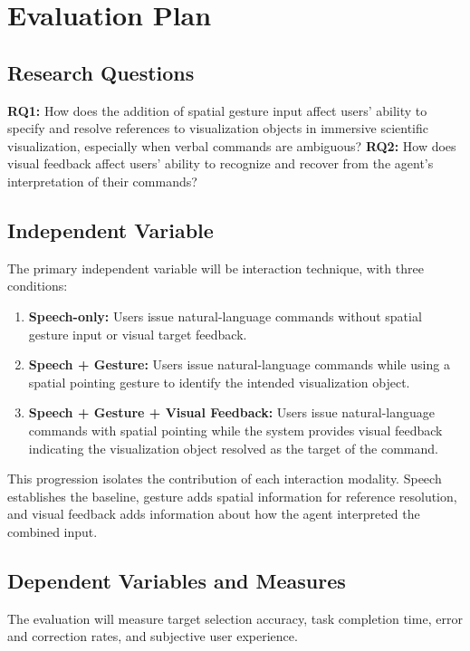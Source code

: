\documentclass[sigconf,nonacm]{acmart}
\begin{document}
\section{Evaluation Plan}
\subsection{Research Questions}

\textbf{RQ1:} How does the addition of spatial gesture input affect users' ability to specify and resolve references to visualization objects in immersive scientific visualization, especially when verbal commands are ambiguous?
\textbf{RQ2:} How does visual feedback affect users' ability to recognize and recover from the agent's interpretation of their commands?

\subsection{Independent Variable}
The primary independent variable will be interaction technique, with three conditions:

\begin{enumerate}
\item \textbf{Speech-only:} Users issue natural-language commands without spatial gesture input or visual target feedback.
\item \textbf{Speech + Gesture:} Users issue natural-language commands while using a spatial pointing gesture to identify the intended visualization object. 
\item \textbf{Speech + Gesture + Visual Feedback:} Users issue natural-language commands with spatial pointing while the system provides visual feedback indicating the visualization object resolved as the target of the command.
\end{enumerate}

This progression isolates the contribution of each interaction modality. Speech establishes the baseline, gesture adds spatial information for reference resolution, and visual feedback adds information about how the agent interpreted the combined input.

\subsection{Dependent Variables and Measures}
The evaluation will measure target selection accuracy, task completion time, error and correction rates, and subjective user experience.
\end{document}
